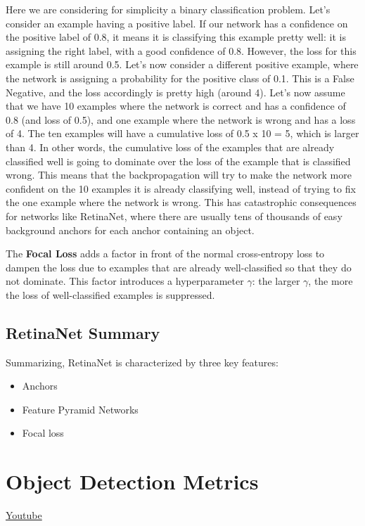 Here we are considering for simplicity a binary classification problem. Let's consider an example having a positive label. If our network has a confidence on the positive label of 0.8, it means it is classifying this example pretty well: it is assigning the right label, with a good confidence of 0.8. However, the loss for this example is still around 0.5. Let's now consider a different positive example, where the network is assigning a probability for the positive class of 0.1. This is a False Negative, and the loss accordingly is pretty high (around 4). Let's now assume that we have 10 examples where the network is correct and has a confidence of 0.8 (and loss of 0.5), and one example where the network is wrong and has a loss of 4. The ten examples will have a cumulative loss of 0.5 x 10 = 5, which is larger than 4. In other words, the cumulative loss of the examples that are already classified well is going to dominate over the loss of the example that is classified wrong. This means that the backpropagation will try to make the network more confident on the 10 examples it is already classifying well, instead of trying to fix the one example where the network is wrong. This has catastrophic consequences for networks like RetinaNet, where there are usually tens of thousands of easy background anchors for each anchor containing an object.

The \textbf{Focal Loss} adds a factor in front of the normal cross-entropy loss to dampen the loss due to examples that are already well-classified so that they do not dominate. This factor introduces a hyperparameter \(\gamma\): the larger \(\gamma\), the more the loss of well-classified examples is suppressed.

\subsection{RetinaNet Summary}

Summarizing, RetinaNet is characterized by three key features:

\begin{itemize}
    \item Anchors
    \item Feature Pyramid Networks
    \item Focal loss
\end{itemize}

\section{Object Detection Metrics}
\href{https://www.youtube.com/watch?v=lfAoIpBKG5A&t=13s&ab_channel=Udacity}{Youtube} \newline

